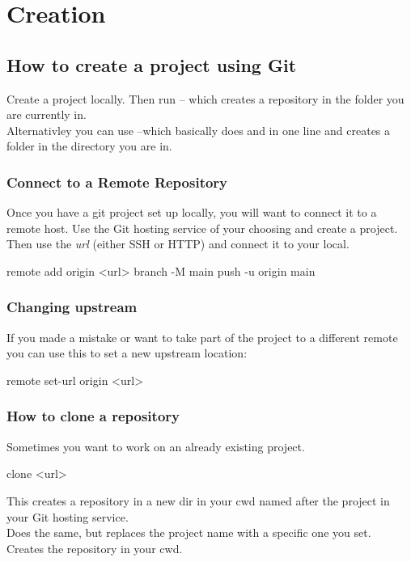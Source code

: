 \chapter{Creation}
\chapteroverlay
\section{How to create a project using Git}
Create a project locally. Then run  -- which creates a repository in the folder you are currently in.\\
Alternativley you can use   --which basically does  and  in one line and creates a folder in the directory you are in.\\

\subsection{Connect to a Remote Repository}
Once you have a git project set up locally, you will want to connect it to a remote host. Use the Git hosting service of your choosing and create a project. Then use the \textit{url} (either SSH or HTTP) and connect it to your local.
\begin{gitBashBox}
remote add origin <url>
branch -M main
push -u origin main
\end{gitBashBox}

\subsection{Changing upstream}
If you made a mistake or want to take part of the project to a different remote you can use this to set a new upstream location:
\begin{gitBashBox}
remote set-url origin <url>
\end{gitBashBox}

\subsection{How to clone a repository}
Sometimes you want to work on an already existing project. 
\begin{gitBashBox}
clone <url>
\end{gitBashBox}
This creates a repository in a new dir in your cwd named after the project in your Git hosting service.\\
\noindent{}
Does the same, but replaces the project name with a specific one you set.\\
\noindent{}
Creates the repository in your cwd.